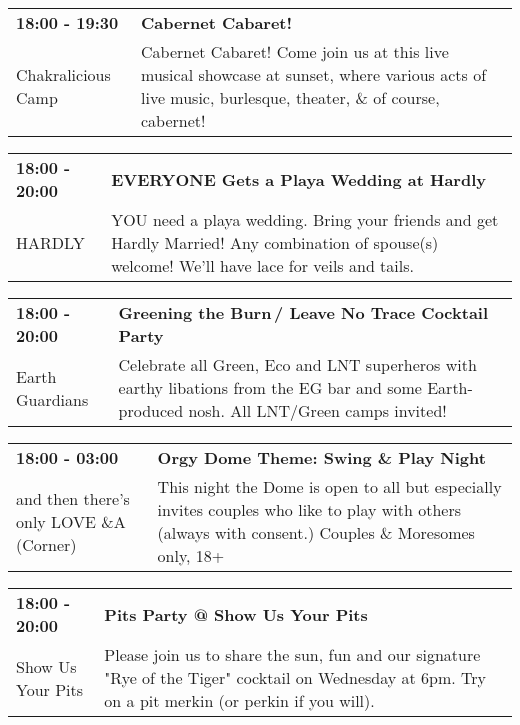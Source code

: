 \begin{tabular}{ p{1in} p{2.2in} }
    \textbf{18:00 - 19:30} & \textbf{Cabernet Cabaret!} \\
    Chakralicious Camp \newline  & Cabernet Cabaret! Come join us at this live musical showcase at sunset, where various acts of live music, burlesque, theater, \& of course, cabernet! \\
    \hline 
\end{tabular}
    
\begin{tabular}{ p{1in} p{2.2in} }
    \textbf{18:00 - 20:00} & \textbf{EVERYONE Gets a Playa Wedding at Hardly} \\
    HARDLY \newline  & YOU need a playa wedding. Bring your friends and get Hardly Married! Any combination of spouse(s) welcome! We'll have lace for veils and tails. \\
    \hline 
\end{tabular}
    
\begin{tabular}{ p{1in} p{2.2in} }
    \textbf{18:00 - 20:00} & \textbf{Greening the Burn\,/ Leave No Trace Cocktail Party} \\
    Earth Guardians \newline  & Celebrate all Green, Eco and LNT superheros with earthy libations from the EG bar and some Earth-produced nosh. All LNT/Green camps invited! \\
    \hline 
\end{tabular}
    
\begin{tabular}{ p{1in} p{2.2in} }
    \textbf{18:00 - 03:00} & \textbf{Orgy Dome Theme: Swing \& Play Night} \\
    and then there's only LOVE \newline 4\&A (Corner) & This night the Dome is open to all but especially invites couples who like to play with others (always with consent.) Couples \& Moresomes only, 18+ \\
    \hline 
\end{tabular}
    
\begin{tabular}{ p{1in} p{2.2in} }
    \textbf{18:00 - 20:00} & \textbf{Pits Party @ Show Us Your Pits} \\
    Show Us Your Pits \newline  & Please join us to share the sun, fun and our signature "Rye of the Tiger" cocktail on Wednesday at 6pm. Try on a pit merkin (or perkin if you will). \\
    \hline 
\end{tabular}
    
